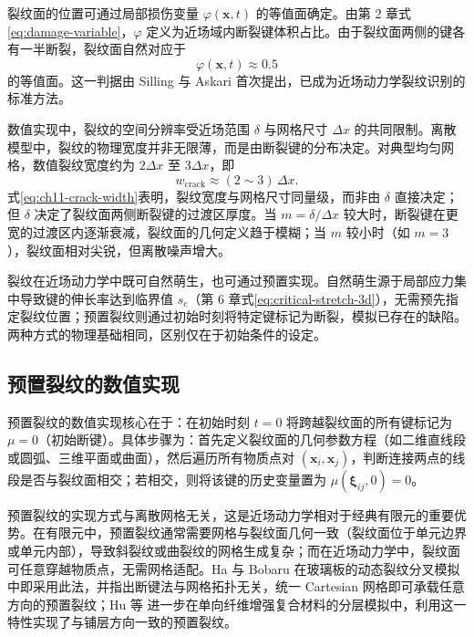 裂纹面的位置可通过局部损伤变量 $\varphi(\mathbf{x},t)$ 的等值面确定。由第 2 章式\eqref{eq:damage-variable}，$\varphi$ 定义为近场域内断裂键体积占比。由于裂纹面两侧的键各有一半断裂，裂纹面自然对应于
\begin{equation}
\varphi(\mathbf{x},t)\approx 0.5
\label{eq:ch11-crack-surface}
\end{equation}
的等值面。这一判据由 Silling 与 Askari \cite{SillingAskari2005} 首次提出，已成为近场动力学裂纹识别的标准方法。

数值实现中，裂纹的空间分辨率受近场范围 $\delta$ 与网格尺寸 $\Delta x$ 的共同限制。离散模型中，裂纹的物理宽度并非无限薄，而是由断裂键的分布决定。对典型均匀网格，数值裂纹宽度约为 $2\Delta x$ 至 $3\Delta x$，即
\begin{equation}
w_{\mathrm{crack}}\approx(2\sim3)\,\Delta x.
\label{eq:ch11-crack-width}
\end{equation}
式\eqref{eq:ch11-crack-width}表明，裂纹宽度与网格尺寸同量级，而非由 $\delta$ 直接决定；但 $\delta$ 决定了裂纹面两侧断裂键的过渡区厚度。当 $m=\delta/\Delta x$ 较大时，断裂键在更宽的过渡区内逐渐衰减，裂纹面的几何定义趋于模糊；当 $m$ 较小时（如 $m=3$），裂纹面相对尖锐，但离散噪声增大。

裂纹在近场动力学中既可自然萌生，也可通过预置实现。自然萌生源于局部应力集中导致键的伸长率达到临界值 $s_c$（第 6 章式\eqref{eq:critical-stretch-3d}），无需预先指定裂纹位置；预置裂纹则通过初始时刻将特定键标记为断裂，模拟已存在的缺陷。两种方式的物理基础相同，区别仅在于初始条件的设定。

\subsection{预置裂纹的数值实现}\label{sec:ch11-pre-crack}

预置裂纹的数值实现核心在于：在初始时刻 $t=0$ 将跨越裂纹面的所有键标记为 $\mu=0$（初始断键）。具体步骤为：首先定义裂纹面的几何参数方程（如二维直线段或圆弧、三维平面或曲面），然后遍历所有物质点对 $(\mathbf{x}_i,\mathbf{x}_j)$，判断连接两点的线段是否与裂纹面相交；若相交，则将该键的历史变量置为 $\mu(\boldsymbol{\xi}_{ij},0)=0$。

预置裂纹的实现方式与离散网格无关，这是近场动力学相对于经典有限元的重要优势。在有限元中，预置裂纹通常需要网格与裂纹面几何一致（裂纹面位于单元边界或单元内部），导致斜裂纹或曲裂纹的网格生成复杂；而在近场动力学中，裂纹面可任意穿越物质点，无需网格适配。Ha 与 Bobaru \cite{HaBobaru2010} 在玻璃板的动态裂纹分叉模拟中即采用此法，并指出断键法与网格拓扑无关，统一 Cartesian 网格即可承载任意方向的预置裂纹；Hu 等 \cite{HuHaBobaru2012} 进一步在单向纤维增强复合材料的分层模拟中，利用这一特性实现了与铺层方向一致的预置裂纹。

